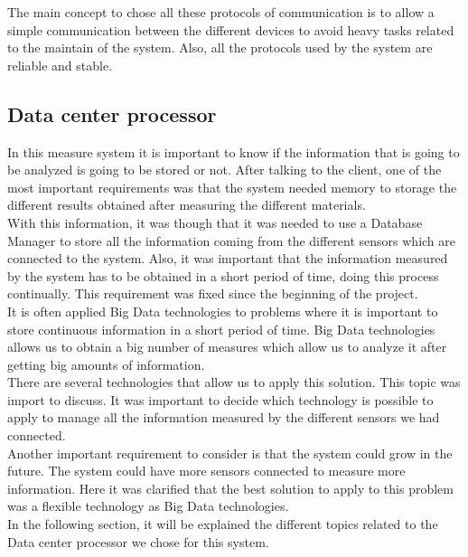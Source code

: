 The main concept to chose all these protocols of communication is to allow a simple communication between the different devices to avoid heavy tasks related to the maintain of the system. Also, all the protocols used by the system are reliable and stable.

\subsection{Data center processor}

In this measure system it is important to know if the information that is going to be analyzed is going to be stored or not. After talking to the client, one of the most important requirements was that the system needed memory to storage the different results obtained after measuring the different materials.\\

With this information, it was though that it was needed to use a Database Manager to store all the information coming from the different sensors which are connected to the system. Also, it was important that the information measured by the system has to be obtained in a short period of time, doing this process continually. This requirement was fixed since the beginning of the project.\\

It is often applied Big Data technologies to problems where it is important to store continuous information in a short period of time. Big Data technologies allows us to obtain a big number of measures which allow us to analyze it after getting big amounts of information.\\

There are several technologies that allow us to apply this solution. This topic was import to discuss. It was important to decide which technology is possible to apply to manage all the information measured by the different sensors we had connected.\\

Another important requirement to consider is that the system could grow in the future. The system could have more sensors connected to measure more information. Here it was clarified that the best solution to apply to this problem was a flexible technology as Big Data technologies.\\

In the following section, it will be explained the different topics related to the Data center processor we chose for this system.

